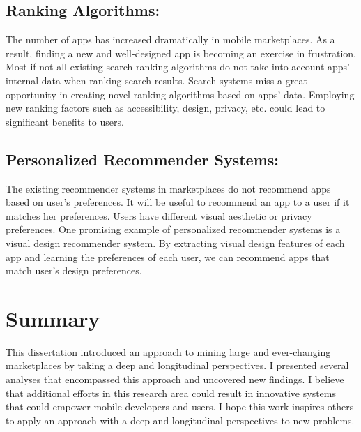 \subsection*{Ranking Algorithms:}
The number of apps has increased dramatically in mobile marketplaces.
As a result, finding a new and well-designed app is becoming an exercise in frustration.
Most if not all existing search ranking algorithms do not take into account apps' internal data when ranking search results.
Search systems miss a great opportunity in creating novel ranking algorithms based on apps' data.
Employing new ranking factors such as accessibility, design, privacy, etc. could lead to significant benefits to users.

\subsection*{Personalized Recommender Systems:}
The existing recommender systems in marketplaces do not recommend apps based on user's preferences.
It will be useful to recommend an app to a user if it matches her preferences.
Users have different visual aesthetic or privacy preferences.
One promising example of personalized recommender systems is a visual design recommender system.
By extracting visual design features of each app and learning the preferences of each user, we can recommend apps that match user's design preferences.

\section{Summary}
This dissertation introduced an approach to mining large and ever-changing marketplaces by taking a deep and longitudinal perspectives.
I presented several analyses that encompassed this approach and uncovered new findings.
I believe that additional efforts in this research area could result in innovative systems that could empower mobile developers and users.
I hope this work inspires others to apply an approach with a deep and longitudinal perspectives to new problems.